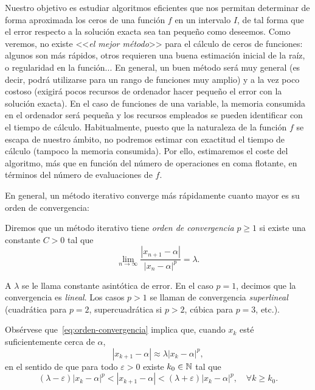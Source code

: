 Nuestro objetivo es estudiar algoritmos eficientes que nos permitan
determinar de forma aproximada los ceros de una función $f$ en un
intervalo $I$, de tal forma que el error respecto a la solución exacta
sea tan pequeño como deseemos. Como veremos, no existe <<\textit{el
  mejor método}>> para el cálculo de ceros de funciones: algunos son
más rápidos, otros requieren una buena estimación inicial de la raíz,
o regularidad en la función... En general, un buen método será muy
general (es decir, podrá utilizarse para un rango de funciones muy
amplio) y a la vez poco costoso (exigirá pocos recursos de ordenador
hacer pequeño el error con la solución exacta). En el caso de
funciones de una variable, la memoria consumida en el ordenador será
pequeña y los recursos empleados se pueden identificar con el tiempo de
cálculo. Habitualmente, puesto que la naturaleza de la función $f$ se
escapa de nuestro ámbito,  no podremos estimar con exactitud el
tiempo de cálculo (tampoco la memoria consumida). Por ello,
estimaremos el coste del algoritmo, más que en función del
número de operaciones en coma flotante, en términos del número de
evaluaciones de $f$.

En general, un método iterativo converge más rápidamente cuanto mayor
es su orden de convergencia:

\begin{definition}
  \label{def:orden-convergencia}  
  Diremos que un método iterativo tiene \textit{orden de convergencia}
  $p\ge 1$ si existe una constante $C>0$ tal que
  \begin{equation}
    \label{eq:orden-convergencia}
    \lim_{n\to\infty} \frac{|x_{n+1}-\alpha|}{|x_n-\alpha|^p} = \lambda.
  \end{equation}
\end{definition}
A $\lambda$ se le llama constante asintótica de error. En el caso
$p=1$, decimos que la convergencia es \textit{lineal}. Los casos $p>1$
se llaman de convergencia \textit{superlineal} (cuadrática para $p=2$,
supercuadrática si $p>2$, cúbica para $p=3$, etc.).

Obsérvese que~\eqref{eq:orden-convergencia} implica que, cuando $x_k$
esté suficientemente cerca de $\alpha$,
\begin{equation*}
   |x_{k+1}-\alpha| \approx \lambda |x_{k}-\alpha|^p,
\end{equation*}
en el sentido de que para todo $\varepsilon>0$ existe $k_0\in\operatorname{{\mathbb N}}$ tal que
  \begin{equation*}
    (\lambda-\varepsilon) |x_{k}-\alpha|^p < |x_{k+1}-\alpha| < 
    (\lambda+\varepsilon)  |x_{k}-\alpha|^p, \quad \forall k \ge k_0.
  \end{equation*}

